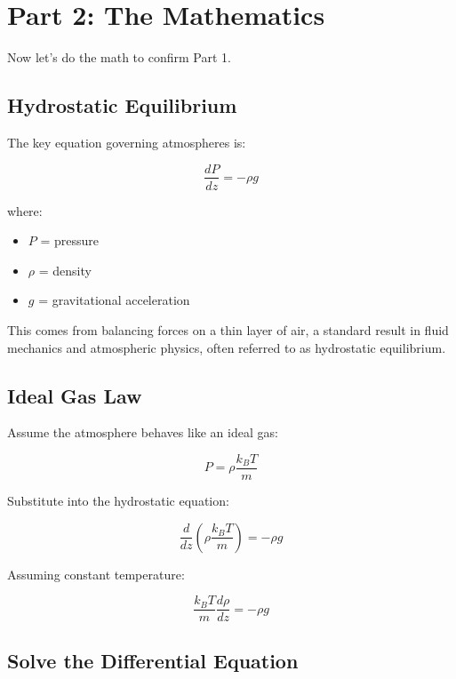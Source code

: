 \documentclass[11pt, letterpaper]{article}
\begin{document}
\section{Part 2: The Mathematics}

Now let’s do the math to confirm Part 1.

\subsection{Hydrostatic Equilibrium}

The key equation governing atmospheres is:

\begin{equation}
\frac{dP}{dz} = -\rho g
\end{equation}

where:

\begin{itemize}
\item $P$ = pressure
\item $\rho$ = density
\item $g$ = gravitational acceleration
\end{itemize}

This comes from balancing forces on a thin layer of air, a standard result in fluid mechanics and atmospheric physics, often referred to as hydrostatic equilibrium.

\subsection{Ideal Gas Law}

Assume the atmosphere behaves like an ideal gas:

\begin{equation}
P = \rho \frac{k_B T}{m}
\end{equation}

Substitute into the hydrostatic equation:

\begin{equation}
\frac{d}{dz} \left( \rho \frac{k_B T}{m} \right) = -\rho g
\end{equation}

Assuming constant temperature:

\begin{equation}
\frac{k_B T}{m} \frac{d\rho}{dz} = -\rho g
\end{equation}

\subsection{Solve the Differential Equation}
\end{document}
